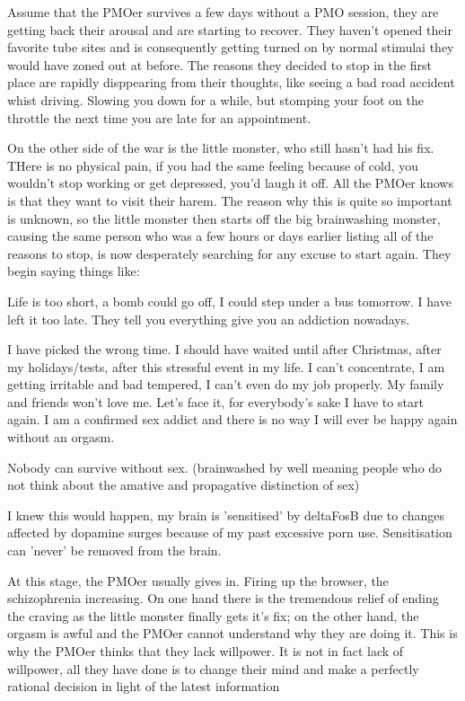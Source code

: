 \documentclass[easypeasy.tex]{subfiles}
\begin{document}
Assume that the PMOer survives a few days without a PMO session, they are getting back their arousal and are starting to recover. They haven't opened their favorite tube sites and is consequently getting turned on by normal stimulai they would have zoned out at before. The reasons they decided to stop in the first place are rapidly disppearing from their thoughts, like seeing a bad road accident whist driving. Slowing you down for a while, but stomping your foot on the throttle the next time you are late for an appointment.

On the other side of the war is the little monster, who still hasn't had his fix. THere is no physical pain, if you had the same feeling because of cold, you wouldn't stop working or get depressed, you'd laugh it off. All the PMOer knows is that they want to visit their harem. The reason why this is quite so important is unknown, so the little monster then starts off the big brainwashing monster, causing the same person who was a few hours or days earlier listing all of the reasons to stop, is now desperately searching for any excuse to start again. They begin saying things like:

  Life is too short, a bomb could go off, I could step under a bus tomorrow. I have left it too late. They tell you everything give you an addiction nowadays.

  I have picked the wrong time. I should have waited until after Christmas, after my holidays/tests, after this stressful event in my life. I can't concentrate, I am getting irritable and bad tempered, I can't even do my job properly. My family and friends won't love me. Let's face it, for everybody's sake I have to start again. I am a confirmed sex addict and there is no way I will ever be happy again without an orgasm.

  Nobody can survive without sex. (brainwashed by well meaning people who do not think about the amative and propagative distinction of sex)

  I knew this would happen, my brain is 'sensitised' by deltaFosB due to changes affected by dopamine surges because of my past excessive porn use. Sensitisation can 'never' be removed from the brain.

At this stage, the PMOer usually gives in. Firing up the browser, the schizophrenia increasing. On one hand there is the tremendous relief of ending the craving as the little monster finally gets it's fix; on the other hand, the orgasm is awful and the PMOer cannot understand why they are doing it. This is why the PMOer thinks that they lack willpower. It is not in fact lack of willpower, all they have done is to change their mind and make a perfectly rational decision in light of the latest information
  
\end{document}
